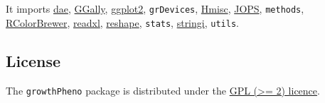 \documentclass[
]{article}
\begin{document}
It imports \href{https://CRAN.R-project.org/package=dae}{dae},
\href{https://CRAN.R-project.org/package=GGally}{GGally},
\href{https://CRAN.R-project.org/package=ggplot2}{ggplot2},
\texttt{grDevices},
\href{https://CRAN.R-project.org/package=Hmisc}{Hmisc},
\href{https://CRAN.R-project.org/package=JOPS}{JOPS}, \texttt{methods},
\href{https://CRAN.R-project.org/package=RColorBrewer}{RColorBrewer},
\href{https://CRAN.R-project.org/package=readxl}{readxl},
\href{https://CRAN.R-project.org/package=reshape}{reshape},
\texttt{stats},
\href{https://CRAN.R-project.org/package=stringi}{stringi},
\texttt{utils}.

\subsection{License}\label{license}

The \texttt{growthPheno} package is distributed under the
\href{https://opensource.org/licenses/GPL-2.0}{GPL (\textgreater= 2)
licence}.
\end{document}
